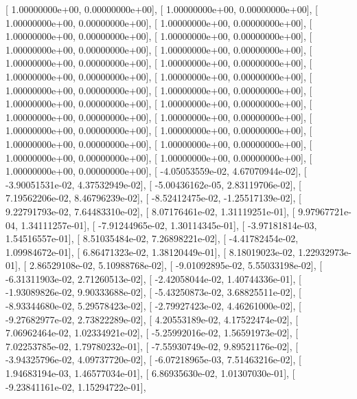 \documentclass{article}
\begin{document}
       [  1.00000000e+00,   0.00000000e+00],
       [  1.00000000e+00,   0.00000000e+00],
       [  1.00000000e+00,   0.00000000e+00],
       [  1.00000000e+00,   0.00000000e+00],
       [  1.00000000e+00,   0.00000000e+00],
       [  1.00000000e+00,   0.00000000e+00],
       [  1.00000000e+00,   0.00000000e+00],
       [  1.00000000e+00,   0.00000000e+00],
       [  1.00000000e+00,   0.00000000e+00],
       [  1.00000000e+00,   0.00000000e+00],
       [  1.00000000e+00,   0.00000000e+00],
       [  1.00000000e+00,   0.00000000e+00],
       [  1.00000000e+00,   0.00000000e+00],
       [  1.00000000e+00,   0.00000000e+00],
       [  1.00000000e+00,   0.00000000e+00],
       [  1.00000000e+00,   0.00000000e+00],
       [  1.00000000e+00,   0.00000000e+00],
       [  1.00000000e+00,   0.00000000e+00],
       [  1.00000000e+00,   0.00000000e+00],
       [  1.00000000e+00,   0.00000000e+00],
       [  1.00000000e+00,   0.00000000e+00],
       [  1.00000000e+00,   0.00000000e+00],
       [  1.00000000e+00,   0.00000000e+00],
       [  1.00000000e+00,   0.00000000e+00],
       [  1.00000000e+00,   0.00000000e+00],
       [ -4.05053559e-02,   4.67070944e-02],
       [ -3.90051531e-02,   4.37532949e-02],
       [ -5.00436162e-05,   2.83119706e-02],
       [  7.19562206e-02,   8.46796239e-02],
       [ -8.52412475e-02,  -1.25517139e-02],
       [  9.22791793e-02,   7.64483310e-02],
       [  8.07176461e-02,   1.31119251e-01],
       [  9.97967721e-04,   1.34111257e-01],
       [ -7.91244965e-02,   1.30114345e-01],
       [ -3.97181814e-03,   1.54516557e-01],
       [  8.51035484e-02,   7.26898221e-02],
       [ -4.41782454e-02,   1.09984672e-01],
       [  6.86471323e-02,   1.38120449e-01],
       [  8.18019023e-02,   1.22932973e-01],
       [  2.86529108e-02,   5.10988768e-02],
       [ -9.01092895e-02,   5.55033198e-02],
       [ -6.31311903e-02,   2.71260513e-02],
       [ -2.42058044e-02,   1.40744336e-01],
       [ -1.93089826e-02,   9.90333688e-02],
       [ -5.43250873e-02,   3.68825511e-02],
       [ -8.93344680e-02,   5.29578423e-02],
       [ -2.79927423e-02,   4.46261000e-02],
       [ -9.27682977e-02,   2.73822289e-02],
       [  4.20553189e-02,   4.17522474e-02],
       [  7.06962464e-02,   1.02334921e-02],
       [ -5.25992016e-02,   1.56591973e-02],
       [  7.02253785e-02,   1.79780232e-01],
       [ -7.55930749e-02,   9.89521176e-02],
       [ -3.94325796e-02,   4.09737720e-02],
       [ -6.07218965e-03,   7.51463216e-02],
       [  1.94683194e-03,   1.46577034e-01],
       [  6.86935630e-02,   1.01307030e-01],
       [ -9.23841161e-02,   1.15294722e-01],
\end{document}

